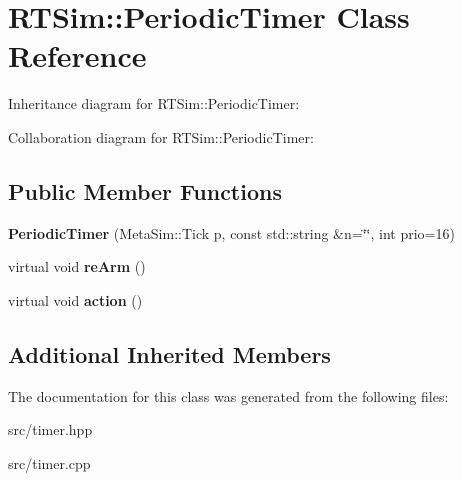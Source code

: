 \hypertarget{classRTSim_1_1PeriodicTimer}{}\section{R\+T\+Sim\+:\+:Periodic\+Timer Class Reference}
\label{classRTSim_1_1PeriodicTimer}


Inheritance diagram for R\+T\+Sim\+:\+:Periodic\+Timer\+:


Collaboration diagram for R\+T\+Sim\+:\+:Periodic\+Timer\+:
\subsection*{Public Member Functions}
\begin{DoxyCompactItemize}
\item 
{\bfseries Periodic\+Timer} (Meta\+Sim\+::\+Tick p, const std\+::string \&n=\char`\"{}\char`\"{}, int prio=16)\hypertarget{classRTSim_1_1PeriodicTimer_aa1813688f36fe2dbace77527bbda374d}{}\label{classRTSim_1_1PeriodicTimer_aa1813688f36fe2dbace77527bbda374d}

\item 
virtual void {\bfseries re\+Arm} ()\hypertarget{classRTSim_1_1PeriodicTimer_a4d05312ba032739cf18033d599480077}{}\label{classRTSim_1_1PeriodicTimer_a4d05312ba032739cf18033d599480077}

\item 
virtual void {\bfseries action} ()\hypertarget{classRTSim_1_1PeriodicTimer_adb977f50f77ac431eec081dfbe181d26}{}\label{classRTSim_1_1PeriodicTimer_adb977f50f77ac431eec081dfbe181d26}

\end{DoxyCompactItemize}
\subsection*{Additional Inherited Members}


The documentation for this class was generated from the following files\+:\begin{DoxyCompactItemize}
\item 
src/timer.\+hpp\item 
src/timer.\+cpp\end{DoxyCompactItemize}
